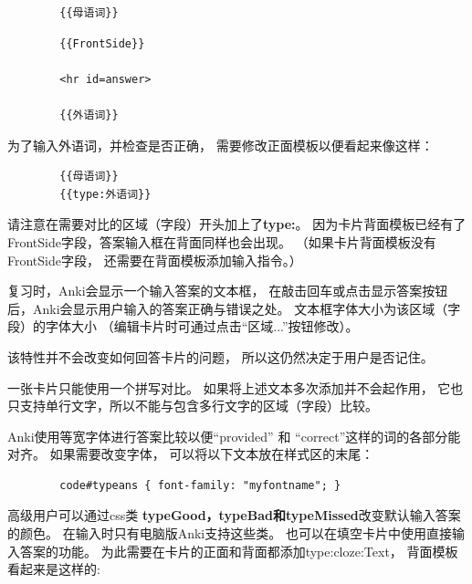 \documentclass[a4paper]{book}
\begin{document}
	\begin{shaded}\begin{verbatim}
		{{母语词}}
		\end{verbatim}\end{shaded}
	\begin{shaded}\begin{verbatim}
		{{FrontSide}}
		
		<hr id=answer>
		
		{{外语词}}
		\end{verbatim}\end{shaded}
	为了输入外语词，并检查是否正确， 需要修改正面模板以便看起来像这样：
	
	\begin{shaded}\begin{verbatim}
		{{母语词}}
		{{type:外语词}}
		\end{verbatim}\end{shaded}
	请注意在需要对比的区域（字段）开头加上了\textbf{type:}。 因为卡片背面模板已经有了FrontSide字段，答案输入框在背面同样也会出现。 （如果卡片背面模板没有FrontSide字段， 还需要在背面模板添加输入指令。）
	
	复习时，Anki会显示一个输入答案的文本框， 在敲击回车或点击显示答案按钮后，Anki会显示用户输入的答案正确与错误之处。 文本框字体大小为该区域（字段）的字体大小 （编辑卡片时可通过点击“区域...”按钮修改）。
	
	该特性并不会改变如何回答卡片的问题， 所以这仍然决定于用户是否记住。
	
	
	
	\begin{shaded}
		一张卡片只能使用一个拼写对比。 如果将上述文本多次添加并不会起作用， 它也只支持单行文字，所以不能与包含多行文字的区域（字段）比较。
	\end{shaded}
	
	Anki使用等宽字体进行答案比较以便“provided” 和 “correct”这样的词的各部分能对齐。 如果需要改变字体， 可以将以下文本放在样式区的末尾：
	
	\begin{shaded}\begin{verbatim}
		code#typeans { font-family: "myfontname"; }
		\end{verbatim}\end{shaded}
	高级用户可以通过css类
	\textbf{typeGood，typeBad和typeMissed}改变默认输入答案的颜色。 在输入时只有电脑版Anki支持这些类。
	也可以在填空卡片中使用直接输入答案的功能。 为此需要在卡片的正面和背面都添加{{type:cloze:Text}}， 背面模板看起来是这样的:
	
\end{document}
